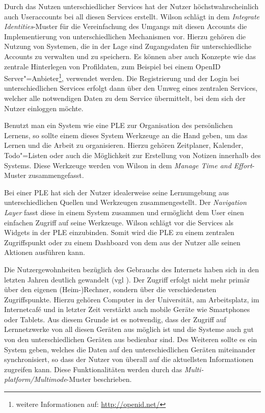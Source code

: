 Durch das Nutzen unterschiedlicher Services hat der Nutzer höchstwahrscheinlich auch Useraccounts bei all diesen Services erstellt. Wilson schlägt in dem \emph{Integrate Identities}-Muster für die Vereinfachung des Umgangs mit diesen Accounts die Implementierung von unterschiedlichen Mechanismen vor. Hierzu gehören die Nutzung von Systemen, die in der Lage sind Zugangsdaten für unterschiedliche Accounts zu verwalten und zu speichern. Es können aber auch Konzepte wie das zentrale Hinterlegen von Profildaten, zum Beispiel bei einem OpenID Server"=Anbieter\footnote{weitere Informationen auf: \url{http://openid.net/}}, verwendet werden. Die Registrierung und der Login bei unterschiedlichen Services erfolgt dann über den Umweg eines zentralen Services, welcher alle notwendigen Daten zu dem Service übermittelt, bei dem sich der Nutzer einloggen möchte.  

Benutzt man ein System wie eine \ac{PLE} zur Organisation des persönlichen Lernens, so sollte einem dieses System Werkzeuge an die Hand geben, um das Lernen und die Arbeit zu organisieren. Hierzu gehören Zeitplaner, Kalender, Todo"=Listen oder auch die Möglichkeit zur Erstellung von Notizen innerhalb des Systems. Diese Werkzeuge werden von Wilson in dem \emph{Manage Time and Effort}-Muster zusammengefasst.

Bei einer \ac{PLE} hat sich der Nutzer idealerweise seine Lernumgebung aus unterschiedlichen Quellen und Werkzeugen zusammengestellt. Der \emph{Navigation Layer} fasst diese in einem System zusammen und ermöglicht dem User einen einfachen Zugriff auf seine Werkzeuge. Wilson schlägt vor die Services als Widgets in der \ac{PLE} einzubinden. Somit wird die \ac{PLE} zu einem zentralen Zugriffspunkt oder zu einem Dashboard von dem aus der Nutzer alle seinen Aktionen ausführen kann. 

Die Nutzergewohnheiten bezüglich des Gebrauchs des Internets haben sich in den letzten Jahren deutlich gewandelt (vgl \cite{VanHarmelen}). Der Zugriff erfolgt nicht mehr primär über den eigenen (Heim-)Rechner, sondern über die verschiedensten Zugriffspunkte. Hierzu gehören Computer in der Universität, am Arbeitsplatz, im Internetcafé und in letzter Zeit verstärkt auch mobile Geräte wie Smartphones oder Tablets. Aus diesem Grunde ist es notwendig, dass der Zugriff auf Lernnetzwerke von all diesen Geräten aus möglich ist und die Systeme auch gut von den unterschiedlichen Geräten aus bedienbar sind. Des Weiteren sollte es ein System geben, welches die Daten auf den unterschiedlichen Geräten miteinander synchronisiert, so dass der Nutzer von überall auf die aktuellsten Informationen zugreifen kann. Diese Funktionalitäten werden durch das \emph{Multi-platform/Multimode}-Muster beschrieben.

